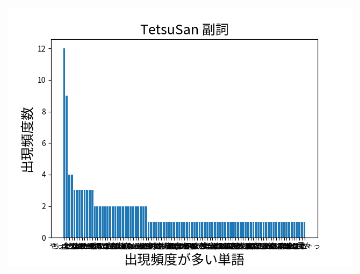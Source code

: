 \documentclass[onecolumn]{ujarticle}   %
\begin{document}
\begin{figure}[hb]
\begin{subfigure}{0.49\columnwidth}
		\end{subfigure}
		\begin{subfigure}{0.49\columnwidth}
			\centering
			\includegraphics[width=1.0\columnwidth]{data/hukusi_TetsuSan.png}
		\end{subfigure}
		\label{fig:histgram1}
	\end{figure}
\end{document}
